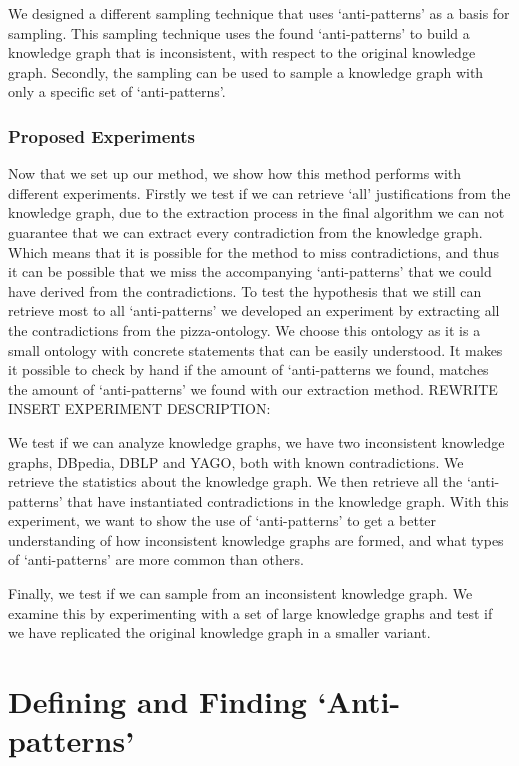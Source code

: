 \documentclass[11pt,letterpaper ,oneside ]{book}
\begin{document}
	We designed a different sampling technique that uses `anti-patterns' as a basis for sampling. This sampling technique uses the found `anti-patterns' to build a knowledge graph that is inconsistent, with respect to the original knowledge graph. Secondly, the sampling can be used to sample a knowledge graph with only a specific set of `anti-patterns'.
	
	\subsection{Proposed Experiments}
	Now that we set up our method, we show how this method performs with different experiments. 
	Firstly we test if we can retrieve `all' justifications from the knowledge graph, due to the extraction process in the final algorithm we can not guarantee that we can extract every contradiction from the knowledge graph. Which means that it is possible for the method to miss contradictions, and thus it can be possible that we miss the accompanying `anti-patterns' that we could have derived from the contradictions. To test the hypothesis that we still can retrieve most to all `anti-patterns' we developed an experiment by extracting all the contradictions from the pizza-ontology. We choose this ontology as it is a small ontology with concrete statements that can be easily understood. It makes it possible to check by hand if the amount of `anti-patterns we found, matches the amount of `anti-patterns' we found with our extraction method.
	REWRITE INSERT EXPERIMENT DESCRIPTION:
	
	We test if we can analyze knowledge graphs, we have two inconsistent knowledge graphs, DBpedia, DBLP and YAGO, both with known contradictions. We retrieve the statistics about the knowledge graph. We then retrieve all the `anti-patterns' that have instantiated contradictions in the knowledge graph. 
	With this experiment, we want to show the use of `anti-patterns' to get a better understanding of how inconsistent knowledge graphs are formed, and what types of `anti-patterns' are more common than others.
	
	Finally, we test if we can sample from an inconsistent knowledge graph. We examine this by experimenting with a set of large knowledge graphs and test if we have replicated the original knowledge graph in a smaller variant.
	
	\newpage
	\chapter{Defining and Finding `Anti-patterns'}\label{Method}
\end{document}
